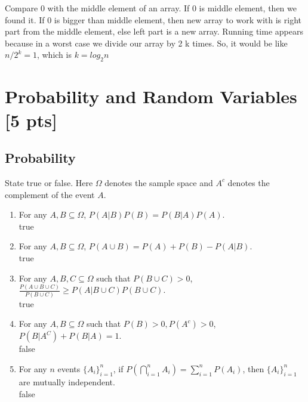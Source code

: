 \documentclass[a4paper]{article}
\theoremstyle{definition}
\newenvironment{soln}{
    \leavevmode\color{blue}\ignorespaces
}{}
\begin{document}
\begin{soln}  Compare 0 with the middle element of an array. If 0 is middle element, then we found it. If 0 is bigger than middle element, then new array to work with is
right part from the middle element, else left part is a new array.  Running time appears because in a worst case we divide our array by 2 k times.
So, it would be like $n/2^k = 1$, which is $k = log_2n$ \end{soln}

\section{Probability and Random Variables [5 pts]}
\subsection{Probability}
State true or false. Here $\Omega$ denotes the sample space and $A^c$ denotes the complement of the event $A$.
\begin{enumerate}
\item For any $A, B \subseteq \Omega$, $P(A|B)P(B) = P(B|A)P(A)$.\\
  \begin{soln}  true \end{soln}
\item For any $A, B \subseteq \Omega$, $P(A \cup B) = P(A) + P(B) - P(A | B)$.\\         
  \begin{soln}  true \end{soln}
\item For any $A, B, C \subseteq \Omega$ such that $P(B \cup C) > 0$,
  $\frac{P(A \cup B \cup C)}{P(B \cup C)} \geq P(A | B \cup C) P(B \cup C)$.
  \\ \begin{soln}  true \end{soln}
\item For any $A, B\subseteq\Omega$ such that $P(B) > 0, P(A^c) > 0$,
  $P(B|A^C) + P(B|A) = 1$.\\ 
  \begin{soln}  false \end{soln}
\item For any $n$ events $\{A_i\}_{i=1}^n$, if
  $P(\bigcap_{i=1}^n A_i) = \sum_{i=1}^n P(A_i)$, then
  $\{A_i\}_{i=1}^n$ are mutually independent.\\
  \begin{soln}  false \end{soln}
\end{enumerate}
\end{document}
